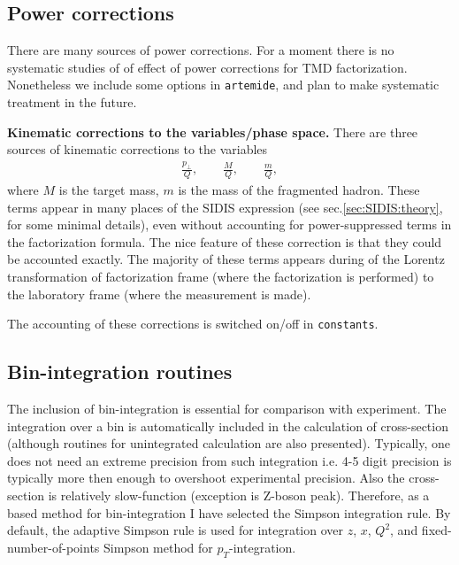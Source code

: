 \documentclass[prd,nofootinbib,eqsecnum,final]{revtex4}
\newcommand{\nn}{\nonumber}
\renewcommand{\(}{\left(}
\renewcommand{\)}{\right)}
\renewcommand{\[}{\left[}
\renewcommand{\]}{\right]}
\begin{document}
\subsection{Power corrections}

There are many sources of power corrections. For a moment there is no systematic studies of of effect of power corrections for TMD factorization. Nonetheless we include some options in \texttt{artemide}, and plan to make systematic treatment in the future.

\textbf{Kinematic corrections to the variables/phase space.} There are three sources of kinematic corrections to the variables
\begin{eqnarray}\nn
\frac{p_\perp}{Q},\qquad \frac{M}{Q},\qquad \frac{m}{Q},
\end{eqnarray}
where $M$ is the target mass, $m$ is the mass of the fragmented hadron. These terms appear in many places of the SIDIS expression (see sec.\ref{sec:SIDIS:theory}, for some minimal details), even without accounting for power-suppressed terms in the factorization formula. The nice feature of these correction is that they could be accounted exactly. The majority of these terms appears during of the Lorentz transformation of factorization frame (where the factorization is performed) to the laboratory frame (where the measurement is made).

The accounting of these corrections is switched on/off in \texttt{constants}. 

\subsection{Bin-integration routines}

The inclusion of bin-integration is essential for comparison with experiment. The integration over a bin is automatically included in the calculation of cross-section (although routines for unintegrated calculation are also presented). Typically, one does not need an extreme precision from such integration i.e. 4-5 digit precision is typically more then enough to overshoot experimental precision. Also the cross-section is relatively slow-function (exception is Z-boson peak). Therefore, as a based method for bin-integration I have selected the Simpson integration rule. By default, the adaptive Simpson rule is used for integration over $z$, $x$, $Q^2$, and fixed-number-of-points Simpson method for $p_T$-integration.
\end{document}

